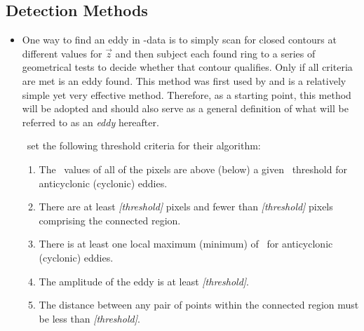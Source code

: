 \subsection{Detection Methods} \label{subsec:detectmethods}
\begin{itemize}

	\item
	One way to find an eddy in \SSH-data is to simply scan for closed contours at different values for $\vec{z}$ and then subject each found ring to a series of geometrical tests to decide whether that contour qualifies. Only if all criteria are met is an eddy found. This method was first used by \citet{Chelton2011} and is a relatively simple yet very effective method. Therefore, as a starting point, this method will be adopted and should also serve as a general definition of what will be referred to as an \textit{eddy} hereafter.
	
~set the following threshold criteria for their algorithm:
	\begin{enumerate}
		\item
		The \SSH~values of all of the pixels are above (below) a given \SSH~threshold for anticyclonic (cyclonic) eddies.
		\item
		There are at least \textit{[threshold]} pixels and fewer than \textit{[threshold]} pixels comprising the connected region.
		\item
		There is at least one local maximum (minimum) of \SSH~for anticyclonic (cyclonic) eddies.
		\item
		The amplitude of the eddy is at least \textit{[threshold]}.
		\item
		The distance between any pair of points within the connected region must be less than \textit{[threshold]}.
	\end{enumerate}


\end{itemize}
